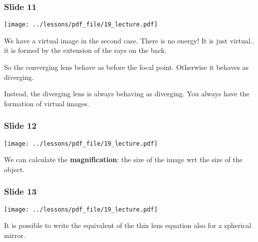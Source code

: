 \documentclass[../main/main.tex]{subfiles}
\begin{document}
\subsubsection*{Slide 11}

\begin{minipage}[]{0.5\linewidth}
\centering
\texttt{[image: ../lessons/pdf\_file/19\_lecture.pdf]}
\end{minipage}
\hspace{0.3cm}\vspace{0.3cm}
\begin{minipage}[c]{0.47\linewidth}

We have a virtual image in the second case. There is no energy! It is just virtual.. it is formed by the extension of the rays on the back.

So the converging lens behave as before the focal point. Otherwise it behaves as diverging.

Instead, the diverging lens is always behaving as diverging. You always have the formation of virtual images.

\end{minipage}

\subsubsection*{Slide 12}

\begin{minipage}[]{0.5\linewidth}
\centering
\texttt{[image: ../lessons/pdf\_file/19\_lecture.pdf]}
\end{minipage}
\hspace{0.3cm}\vspace{0.3cm}
\begin{minipage}[c]{0.47\linewidth}

We can calculate the \textbf{magnification}: the size of the image wrt the size of the object.

\end{minipage}

\subsubsection*{Slide 13}

\begin{minipage}[]{0.5\linewidth}
\centering
\texttt{[image: ../lessons/pdf\_file/19\_lecture.pdf]}
\end{minipage}
\hspace{0.3cm}\vspace{0.3cm}
\begin{minipage}[c]{0.47\linewidth}

It is possible to write the equivalent of the thin lens equation also for a spherical mirror.

\end{minipage}
\end{document}
